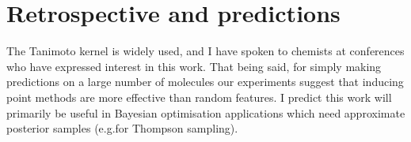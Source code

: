 









\section{Retrospective and predictions}

The Tanimoto kernel is widely used, and I have spoken to chemists at conferences who have expressed interest in this work.
That being said, for simply making predictions on a large number of molecules
our experiments suggest that inducing point methods are more effective than random features.
I predict this work will primarily be useful in Bayesian optimisation applications
which need approximate posterior samples (e.g.\@ for Thompson sampling).
